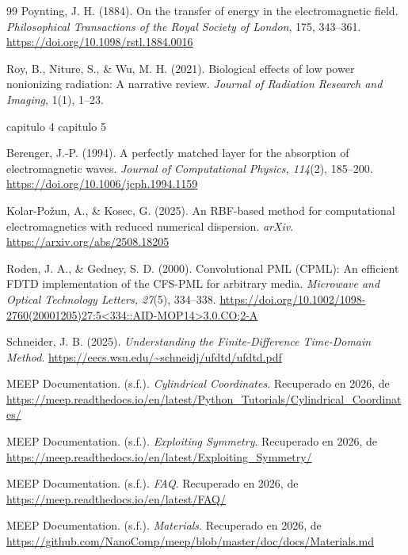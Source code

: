 \begin{thebibliography}{99}
Poynting, J. H. (1884). On the transfer of energy in the electromagnetic field. \textit{Philosophical Transactions of the Royal Society of London}, 175, 343--361. \url{https://doi.org/10.1098/rstl.1884.0016}

Roy, B., Niture, S., \& Wu, M. H. (2021). Biological effects of low power nonionizing radiation: A narrative review. \textit{Journal of Radiation Research and Imaging}, 1(1), 1--23.

capitulo 4
capitulo 5

Berenger, J.-P. (1994). A perfectly matched layer for the absorption of electromagnetic waves. \textit{Journal of Computational Physics, 114}(2), 185--200. \url{https://doi.org/10.1006/jcph.1994.1159}

Kolar-Po\v{z}un, A., \& Kosec, G. (2025). An RBF-based method for computational electromagnetics with reduced numerical dispersion. \textit{arXiv}. \url{https://arxiv.org/abs/2508.18205}

Roden, J. A., \& Gedney, S. D. (2000). Convolutional PML (CPML): An efficient FDTD implementation of the CFS-PML for arbitrary media. \textit{Microwave and Optical Technology Letters, 27}(5), 334--338. \url{https://doi.org/10.1002/1098-2760(20001205)27:5<334::AID-MOP14>3.0.CO;2-A}

Schneider, J. B. (2025). \textit{Understanding the Finite-Difference Time-Domain Method}. \url{https://eecs.wsu.edu/~schneidj/ufdtd/ufdtd.pdf}

MEEP Documentation. (s.f.). \textit{Cylindrical Coordinates}. Recuperado en 2026, de \url{https://meep.readthedocs.io/en/latest/Python_Tutorials/Cylindrical_Coordinates/}

MEEP Documentation. (s.f.). \textit{Exploiting Symmetry}. Recuperado en 2026, de \url{https://meep.readthedocs.io/en/latest/Exploiting_Symmetry/}

MEEP Documentation. (s.f.). \textit{FAQ}. Recuperado en 2026, de \url{https://meep.readthedocs.io/en/latest/FAQ/}

MEEP Documentation. (s.f.). \textit{Materials}. Recuperado en 2026, de \url{https://github.com/NanoComp/meep/blob/master/doc/docs/Materials.md}


\end{thebibliography}
